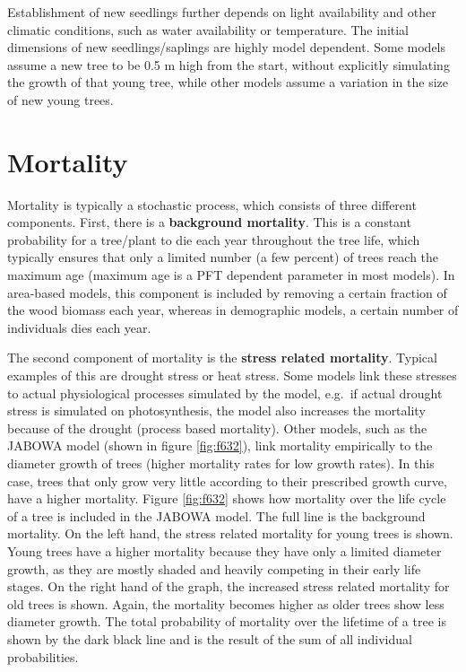 \documentclass[12pt,oneside]{book}
\begin{document}
Establishment of new seedlings further depends on light availability and
other climatic conditions, such as water availability or temperature.
The initial dimensions of new seedlings/saplings are highly model
dependent. Some models assume a new tree to be 0.5 m high from the
start, without explicitly simulating the growth of that young tree,
while other models assume a variation in the size of new young trees.

\section{Mortality}\label{mortality}

Mortality is typically a stochastic process, which consists of three
different components. First, there is a \textbf{background mortality}.
This is a constant probability for a tree/plant to die each year
throughout the tree life, which typically ensures that only a limited
number (a few percent) of trees reach the maximum age (maximum age is a
PFT dependent parameter in most models). In area-based models, this
component is included by removing a certain fraction of the wood biomass
each year, whereas in demographic models, a certain number of
individuals dies each year.

The second component of mortality is the \textbf{stress related
mortality}. Typical examples of this are drought stress or heat stress.
Some models link these stresses to actual physiological processes
simulated by the model, e.g.~if actual drought stress is simulated on
photosynthesis, the model also increases the mortality because of the
drought (process based mortality). Other models, such as the JABOWA
model (shown in figure \ref{fig:f632}), link mortality empirically to
the diameter growth of trees (higher mortality rates for low growth
rates). In this case, trees that only grow very little according to
their prescribed growth curve, have a higher mortality. Figure
\ref{fig:f632} shows how mortality over the life cycle of a tree is
included in the JABOWA model. The full line is the background mortality.
On the left hand, the stress related mortality for young trees is shown.
Young trees have a higher mortality because they have only a limited
diameter growth, as they are mostly shaded and heavily competing in
their early life stages. On the right hand of the graph, the increased
stress related mortality for old trees is shown. Again, the mortality
becomes higher as older trees show less diameter growth. The total
probability of mortality over the lifetime of a tree is shown by the
dark black line and is the result of the sum of all individual
probabilities.
\end{document}
